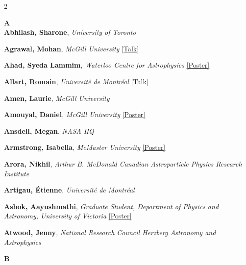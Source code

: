 \begin{small}
\setlength{\columnsep}{1.5em}
\begin{multicols}{2}
\raggedright
\setlength{\parskip}{1.5pt}
\setlength{\parindent}{0pt}

{\sffamily\bfseries\color{cascablue}\large A}\\[2pt]

\textbf{Abhilash, Sharone}, {\footnotesize\textit{University of Toronto}}\par
\textbf{Agrawal, Mohan}, {\footnotesize\textit{McGill University}} \hyperref[abstract-page-talk-200]{\scriptsize\textcolor{cascablue}{[Talk]}}\par
\textbf{Ahad, Syeda Lammim}, {\footnotesize\textit{Waterloo Centre for Astrophysics}} \hyperref[poster-abstract-page-talk-152]{\scriptsize\textcolor{cascateal}{[Poster]}}\par
\textbf{Allart, Romain}, {\footnotesize\textit{Université de Montréal}} \hyperref[abstract-page-talk-234]{\scriptsize\textcolor{cascablue}{[Talk]}}\par
\textbf{Amen, Laurie}, {\footnotesize\textit{McGill University}}\par
\textbf{Amouyal, Daniel}, {\footnotesize\textit{McGill University}} \hyperref[poster-abstract-page-talk-96]{\scriptsize\textcolor{cascateal}{[Poster]}}\par
\textbf{Ansdell, Megan}, {\footnotesize\textit{NASA HQ}}\par
\textbf{Armstrong, Isabella}, {\footnotesize\textit{McMaster University}} \hyperref[poster-abstract-page-talk-50]{\scriptsize\textcolor{cascateal}{[Poster]}}\par
\textbf{Arora, Nikhil}, {\footnotesize\textit{Arthur B. McDonald Canadian Astroparticle Physics Research Institute}}\par
\textbf{Artigau, Étienne}, {\footnotesize\textit{Université de Montréal}}\par
\textbf{Ashok, Aayushmathi}, {\footnotesize\textit{Graduate Student, Department of Physics and Astronomy, University of Victoria}} \hyperref[poster-abstract-page-talk-143]{\scriptsize\textcolor{cascateal}{[Poster]}}\par
\textbf{Atwood, Jenny}, {\footnotesize\textit{National Research Council Herzberg Astronomy and Astrophysics}}\par

{\sffamily\bfseries\color{cascablue}\large B}\\[2pt]


\end{multicols}
\end{small}
